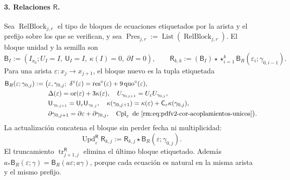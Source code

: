 \paragraph{3. Relaciones \(\mathsf R\).}
Sea \(\operatorname{RelBlock}_{j,r}\) el tipo de bloques de ecuaciones
etiquetados por la arista y el prefijo sobre los que se verifican, y sea
\(\operatorname{Pres}_{j,r}:=\operatorname{List}
(\operatorname{RelBlock}_{j,r})\). El bloque unidad y la semilla son
\begin{equation}
\label{rm:eq:pdfv2-terminal-semilla-r}
 \mathsf B_I:=(I_{x_0};U_I=I,\ \mathsf U_I=I,\ \kappa(I)=0,\ \partial I=0),
 \qquad
 \mathsf R_{k,k}:=(\mathsf B_I)\star
 \mathop{\star}_{i=1}^{k}
 \mathsf B_R(\varepsilon_i;\gamma_{0,i-1}).
\end{equation}
Para una arista \(\varepsilon:x_j\to x_{j+1}\), el bloque nuevo es la
tupla etiquetada
\begin{equation}
\label{rm:eq:pdfv2-terminal-bloque-r}
 \begin{split}
 \mathsf B_R(\varepsilon;\gamma_{0,j}):=\bigl(
 &\varepsilon,\gamma_{0,j};\ 
 \delta^\diamond(\varepsilon)
 =\operatorname{res}^\diamond(\varepsilon)
  +9\operatorname{quo}^\diamond(\varepsilon),\\
 &\Delta(\varepsilon)=\operatorname{or}(\varepsilon)
  +3\kappa(\varepsilon),\quad
 U_{\gamma_{0,j+1}}=U_\varepsilon U_{\gamma_{0,j}},\\
 &\mathsf U_{\gamma_{0,j+1}}
 =\mathsf U_\varepsilon\mathsf U_{\gamma_{0,j}},\quad
 \kappa(\gamma_{0,j+1})
 =\kappa(\varepsilon)+\mathsf C_\varepsilon\kappa(\gamma_{0,j}),\\
 &\partial\gamma_{0,j+1}
 =\partial\varepsilon+\partial\gamma_{0,j},\quad
 \operatorname{Cpl}_\varepsilon
 \text{ de }\eqref{rm:eq:pdfv2-cor-acoplamientos-unicos}
 \bigr).
 \end{split}
\end{equation}
La actualización concatena el bloque sin perder fecha ni multiplicidad:
\begin{equation}
\label{rm:eq:pdfv2-terminal-update-r}
 \operatorname{Upd}^{\mathsf R}_{\varepsilon}\mathsf R_{k,j}
 :=\mathsf R_{k,j}\star\mathsf B_R(\varepsilon;\gamma_{0,j}).
\end{equation}
El truncamiento \(\operatorname{tr}^{\mathsf R}_{j+1,j}\) elimina el último
bloque etiquetado. Además
\(a_*\mathsf B_R(\varepsilon;\gamma)
=\mathsf B_R(a\varepsilon;a\gamma)\), porque cada ecuación es natural en
la misma arista y el mismo prefijo.

